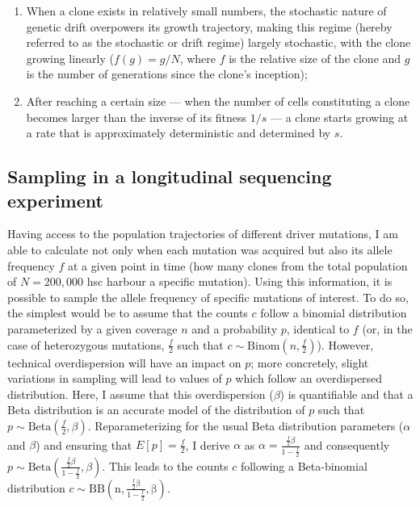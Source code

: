 \begin{enumerate}
    \item When a clone exists in relatively small numbers, the stochastic nature of genetic drift overpowers its growth trajectory, making this regime (hereby referred to as the stochastic or drift regime) largely stochastic, with the clone growing linearly ($f(g) = g/N$, where $f$ is the relative size of the clone and $g$ is the number of generations since the clone's inception);
    \item After reaching a certain size --- when the number of cells constituting a clone becomes larger than the inverse of its fitness $1/s$ --- a clone starts growing at a rate that is approximately deterministic and determined by $s$.
\end{enumerate}

\subsection{Sampling in a longitudinal sequencing experiment}

Having access to the population trajectories of different driver mutations, I am able to calculate not only when each mutation was acquired but also its allele frequency $f$ at a given point in time (how many clones from the total population of $N=200,000$ \ac{hsc} harbour a specific mutation). Using this information, it is possible to sample the allele frequency of specific mutations of interest. To do so, the simplest would be to assume that the counts $c$ follow a binomial distribution parameterized by a given coverage $n$ and a probability $p$, identical to $f$ (or, in the case of heterozygous mutations, $\frac{f}{2}$ such that $c \sim \mathrm{Binom}(n,\frac{f}{2})$). However, technical overdispersion will have an impact on $p$; more concretely, slight variations in sampling will lead to values of $p$ which follow an overdispersed distribution. Here, I assume that this overdispersion ($\beta$) is quantifiable and that a Beta distribution is an accurate model of the distribution of $p$ such that $p \sim \mathrm{Beta}(\frac{f}{2},\beta)$. Reparameterizing for the usual Beta distribution parameters ($\alpha$ and $\beta$) and ensuring that $E[p] = \frac{f}{2}$, I derive $\alpha$ as $\alpha=\frac{\frac{f}{2}\beta}{1-\frac{f}{2}}$ and consequently $p \sim \mathrm{Beta}(\frac{\frac{f}{2}\beta}{1-\frac{f}{2}},\beta)$. This leads to the counts $c$ following a Beta-binomial distribution $c \sim \mathrm{BB(n,\frac{\frac{f}{2}\beta}{1-\frac{f}{2}},\beta)}$. 

